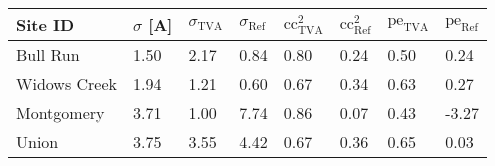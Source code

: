 \begin{tabular}{llllllll}
\toprule
Site ID & $\sigma$ [A] & $\sigma_\text{TVA}$ & $\sigma_\text{Ref}$ & $\text{cc}^2_\text{TVA}$ & $\text{cc}^2_\text{Ref}$ & $\text{pe}_\text{TVA}$ & $\text{pe}_\text{Ref}$ \\
\midrule
Bull Run & 1.50 & 2.17 & 0.84 & 0.80 & 0.24 & 0.50 & 0.24 \\
Widows Creek & 1.94 & 1.21 & 0.60 & 0.67 & 0.34 & 0.63 & 0.27 \\
Montgomery & 3.71 & 1.00 & 7.74 & 0.86 & 0.07 & 0.43 & -3.27 \\
Union & 3.75 & 3.55 & 4.42 & 0.67 & 0.36 & 0.65 & 0.03 \\
\bottomrule
\end{tabular}
